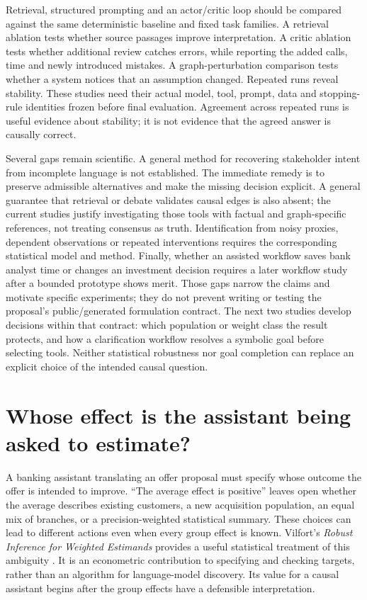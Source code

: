 Retrieval, structured prompting and an actor/critic loop should be
compared against the same deterministic baseline and fixed task
families. A retrieval ablation tests whether source passages improve
interpretation. A critic ablation tests whether additional review
catches errors, while reporting the added calls, time and newly
introduced mistakes. A graph-perturbation comparison tests whether a
system notices that an assumption changed. Repeated runs reveal
stability. These studies need their actual model, tool, prompt, data and
stopping-rule identities frozen before final evaluation. Agreement
across repeated runs is useful evidence about stability; it is not
evidence that the agreed answer is causally correct.

Several gaps remain scientific. A general method for recovering
stakeholder intent from incomplete language is not established. The
immediate remedy is to preserve admissible alternatives and make the
missing decision explicit. A general guarantee that retrieval or debate
validates causal edges is also absent; the current studies justify
investigating those tools with factual and graph-specific references,
not treating consensus as truth. Identification from noisy proxies,
dependent observations or repeated interventions requires the
corresponding statistical model and method. Finally, whether an assisted
workflow saves bank analyst time or changes an investment decision
requires a later workflow study after a bounded prototype shows merit.
Those gaps narrow the claims and motivate specific experiments; they do
not prevent writing or testing the proposal's public/generated
formulation contract. The next two studies develop decisions within that
contract: which population or weight class the result protects, and how a
clarification workflow resolves a symbolic goal before selecting tools.
Neither statistical robustness nor goal completion can replace an explicit
choice of the intended causal question. \label{exec13:formulation-end}


\section{Whose effect is the assistant being asked to estimate?}
\label{exec22:targets-scope}

A banking assistant translating an offer proposal must specify whose outcome
the offer is intended to improve. ``The average effect is positive'' leaves
open whether the average describes existing customers, a new acquisition
population, an equal mix of branches, or a precision-weighted statistical
summary. These choices can lead to different actions even when every group
effect is known. Vilfort's \emph{Robust Inference for Weighted Estimands}
provides a useful statistical treatment of this ambiguity
\citep{exec22_weighted_vilfort}. It is an econometric contribution to specifying
and checking targets, rather than an algorithm for language-model discovery.
Its value for a causal assistant begins after the group effects have a
defensible interpretation.

